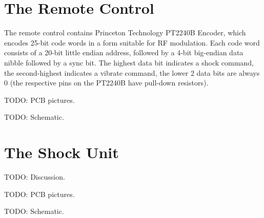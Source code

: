 \documentclass[a4paper]{article}
\begin{document}
\section{The Remote Control}

The remote control contains Princeton Technology PT2240B Encoder, which encodes 25-bit code words in a form suitable for RF modulation. Each code word consists of a 20-bit little endian address, followed by a 4-bit big-endian data nibble followed by a sync bit. The highest data bit indicates a shock command, the second-highest indicates a vibrate command, the lower 2 data bits are always 0 (the respective pins on the PT2240B have pull-down resistors).

TODO: PCB pictures.

TODO: Schematic.

\section{The Shock Unit}

TODO: Discussion.

TODO: PCB pictures.

TODO: Schematic.



\end{document}
